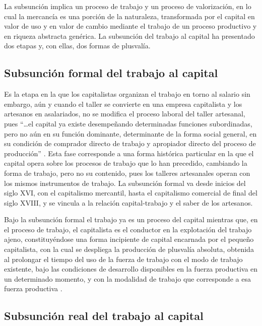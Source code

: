 \documentclass[
  spanish,
  11pt,
  a4paper,
]{scrbook}
\begin{document}
La subsunción implica un proceso de trabajo y un proceso de
valorización, en lo cual la mercancía es una porción de la naturaleza,
transformada por el capital en valor de uso y en valor de cambio
mediante el trabajo de un proceso productivo y en riqueza abstracta
genérica. La subsunción del trabajo al capital ha presentado dos etapas
y, con ellas, dos formas de plusvalía.

\subsection*{Subsunción formal del trabajo al
capital}\label{subsunciuxf3n-formal-del-trabajo-al-capital}

Es la etapa en la que los capitalistas organizan el trabajo en torno al
salario sin embargo, aún y cuando el taller se convierte en una empresa
capitalista y los artesanos en asalariados, no se modifica el proceso
laboral del taller artesanal, pues ``\ldots el capital ya existe
desempeñando determinadas funciones subordinadas, pero no aún en su
función dominante, determinante de la forma social general, en su
condición de comprador directo de trabajo y apropiador directo del
proceso de producción'' \autocite[57-58]{Marx2009inedito}. Esta fase
corresponde a una forma histórica particular en la que el capital opera
sobre los procesos de trabajo que lo han precedido, cambiando la forma
de trabajo, pero no su contenido, pues los talleres artesanales operan
con los mismos instrumentos de trabajo. La subsunción formal va desde
inicios del siglo XVI, con el capitalismo mercantil, hasta el
capitalismo comercial de final del siglo XVIII, y se vincula a la
relación capital-trabajo y el saber de los artesanos.

Bajo la subsunción formal el trabajo ya es un proceso del capital
mientras que, en el proceso de trabajo, el capitalista es el conductor
en la explotación del trabajo ajeno, constituyéndose una forma
incipiente de capital encarnada por el pequeño capitalista, con la cual
se despliega la producción de plusvalía absoluta, obtenida al prolongar
el tiempo del uso de la fuerza de trabajo con el modo de trabajo
existente, bajo las condiciones de desarrollo disponibles en la fuerza
productiva en un determinado momento, y con la modalidad de trabajo que
corresponde a esa fuerza productiva \autocite[58]{Marx2009inedito}.

\subsection*{Subsunción real del trabajo al
capital}\label{subsunciuxf3n-real-del-trabajo-al-capital}
\end{document}
